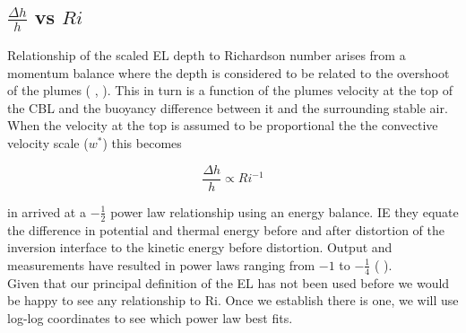 \subsection{$\frac{\Delta h}{h}$ vs $Ri$}

Relationship of the scaled \acs{EL} depth to Richardson number arises from a momentum balance where the depth is considered to be related to the overshoot of the plumes (\citeauthor{Stull73} \cite{Stull73}, \citeauthor{DearWill80} \cite{DearWill80}).  This in turn is a function of the plumes velocity at the top of the \acs{CBL} and the buoyancy difference between it and the surrounding stable air.  When the velocity at the top is assumed to be proportional the the convective velocity scale ($w^{*}$) this becomes

\begin{equation}
\frac{\Delta h}{h} \propto Ri^{-1}
\end{equation}

\citeauthor{Boers89} in \cite{Boers89} arrived at a $-\frac{1}{2}$ power law relationship using an energy balance.  IE they equate the difference in potential and thermal energy before and after distortion of the inversion interface to the kinetic energy before distortion. Output and measurements have resulted in power laws ranging from  $-1$ to $-\frac{1}{4}$ (\citeauthor{Traum11} \cite{Traum11}).\\

Given that our principal definition of the \acs{EL} has not been used before we would be happy to see any relationship to \acs{Ri}.  Once we establish there is one, we will use log-log coordinates to see which power law best fits.\\


\endinput

Any text after an \endinput is ignored.
You could put scraps here or things in progress.


